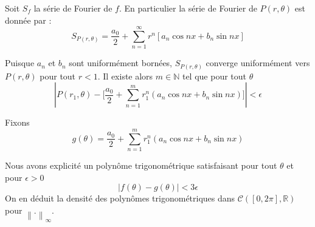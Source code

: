 \documentclass[
	10pt, %
	xcolor={svgnames}
]{beamer}
\begin{document}
\begin{frame}
	Soit \( S_f \) la série de Fourier de \( f \). En particulier la série de Fourier de \( P(r,\theta) \) est donnée par :
	\[
		S_{P(r,\theta)} = \frac{a_0}{2} + 
		\sum_{n=1}^{\infty} r^{n} \left[ a_n \cos nx + b_n \sin nx \right]
	\]

	Puisque \( a_n \) et \( b_n \) sont uniformément bornées, \( S_{P(r,\theta)} \) converge uniformément vers \( P(r,\theta) \) pour tout \( r < 1 \). Il existe alors \( m \in \mathbb{N} \) tel que pour tout \( \theta \) 
	\begin{equation*}
		{\left\lvert P(r_1,\theta) - 
		\lbrack \frac{a_0}{2} + \sum_{n=1}^{m} r_1^{n}(a_n \cos nx + b_n \sin nx) \rbrack \right\rvert} < \epsilon
	\end{equation*}

	Fixons
	\begin{equation*}
		g(\theta) = \frac{a_0}{2} + \sum_{n=1}^{m} r_1^{n}(a_n \cos nx + b_n \sin nx) 
	\end{equation*}

	Nous avons explicité un polynôme trigonométrique satisfaisant pour tout \( \theta \) et pour \( \epsilon > 0 \)
	\begin{equation*}
		{\left\lvert f(\theta) - g(\theta) \right\rvert} < 3\epsilon
	\end{equation*}
	On en déduit la densité des polynômes trigonométriques dans \( \mathcal{C}([0,2\pi],\mathbb{R}) \) pour \( {\left\lVert . \right\rVert}_{\infty} \).
\end{frame}
\end{document}
